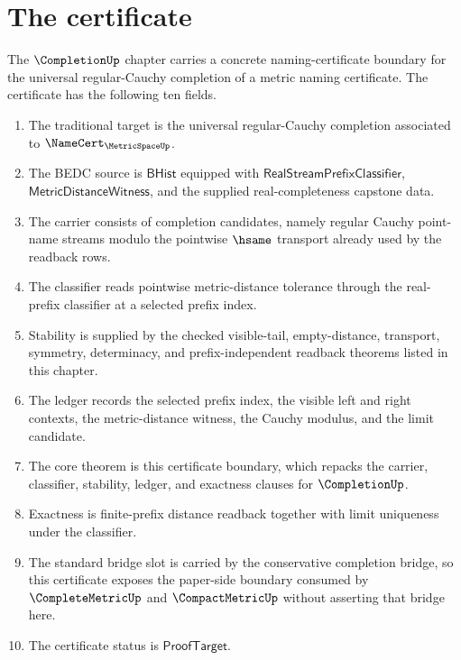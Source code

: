 \section{The certificate}
\label{sec:completion-certificate}

\begin{theorem}\label{thm:concrete-completion-namecert}
The $\CompletionUp$ chapter carries a concrete naming-certificate boundary for the universal
regular-Cauchy completion of a metric naming certificate. The certificate has the following
ten fields.
\begin{enumerate}
\item The traditional target is the universal regular-Cauchy completion associated to
$\NameCert_{\MetricSpaceUp}$.
\item The BEDC source is $\mathsf{BHist}$ equipped with $\mathsf{RealStreamPrefixClassifier}$,
$\mathsf{MetricDistanceWitness}$, and the supplied real-completeness capstone data.
\item The carrier consists of completion candidates, namely regular Cauchy point-name
streams modulo the pointwise $\hsame$ transport already used by the readback rows.
\item The classifier reads pointwise metric-distance tolerance through the real-prefix
classifier at a selected prefix index.
\item Stability is supplied by the checked visible-tail, empty-distance, transport,
symmetry, determinacy, and prefix-independent readback theorems listed in this chapter.
\item The ledger records the selected prefix index, the visible left and right contexts,
the metric-distance witness, the Cauchy modulus, and the limit candidate.
\item The core theorem is this certificate boundary, which repacks the carrier,
classifier, stability, ledger, and exactness clauses for $\CompletionUp$.
\item Exactness is finite-prefix distance readback together with limit uniqueness under
the classifier.
\item The standard bridge slot is carried by the conservative completion bridge, so this
certificate exposes the paper-side boundary consumed by $\CompleteMetricUp$ and
$\CompactMetricUp$ without asserting that bridge here.
\item The certificate status is $\mathsf{ProofTarget}$.
\end{enumerate}
\end{theorem}
